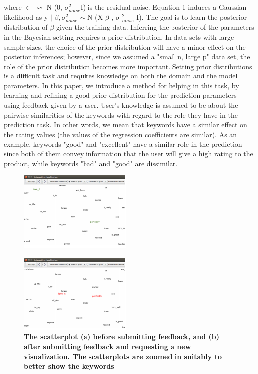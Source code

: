 \documentclass{sig-alternate}
\begin{document}
{ }



where $\in$ $\backsim$ N (0, $\sigma ^{2}_{noise}$I)
is the residual noise. Equation 1 induces
a Gaussian likelihood as y $\mid$ $\beta ,\sigma ^{2}_{noise}$ $\sim$ N (X $\beta$ , $\sigma$ $^{2}_{noise}$ I). The goal is
to learn the posterior distribution of $\beta$  given the training data.
Inferring the posterior of the parameters in the Bayesian setting
requires a prior distribution. In data sets with large sample sizes,
the choice of the prior distribution will have a minor effect on
the posterior inferences; however, since we assumed a "small n,
large p" data set, the role of the prior distribution becomes more
important. Setting prior distributions is a difficult task and requires
knowledge on both the domain and the model parameters. In this
paper, we introduce a method for helping in this task, by learning
and refining a good prior distribution for the prediction parameters
using feedback given by a user. User's knowledge is assumed to be
about the pairwise similarities of the keywords with regard to the
role they have in the prediction task. In other words, we mean that
keywords have a similar effect on the rating values (the values of the
regression coefficients are similar). As an example, keywords "good"
and "excellent" have a similar role in the prediction since both of
them convey information that the user will give a high rating to
the product, while keywords "bad" and "good" are dissimilar.


\begin{figure}[h]
    \centering
    \includegraphics{images/OBRA.png}
    
    \label{obrazoka}
\end{figure}

\begin{figure}[h]
    \centering
    \includegraphics{images/OBRB.png}
    
    \label{obrazokb}
    \caption{\textbf{The scatterplot (a) before submitting feedback, and
(b) after submitting feedback and requesting a new visualization.
The scatterplots are zoomed in suitably to better show
the keywords}}
\end{figure}
\end{document}
